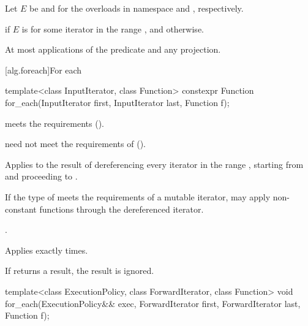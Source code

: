 \begin{itemdescr}
\pnum
Let $E$ be  and 
for the overloads in namespace  and , respectively.

\pnum
\returns
{} if $E$ is 
for some iterator  in the range , and
 otherwise.

\pnum
\complexity
At most  applications of the predicate and any projection.
\end{itemdescr}

[alg.foreach]{For each}

%
\begin{itemdecl}
template<class InputIterator, class Function>
  constexpr Function for_each(InputIterator first, InputIterator last, Function f);
\end{itemdecl}

\begin{itemdescr}
\pnum
\expects
{} meets
the  requirements ().
\begin{note}
 need not meet the requirements of
 ().
\end{note}

\pnum
\effects
Applies  to the result of dereferencing
every iterator in the range ,
starting from  and proceeding to .
\begin{note}
If the type of  meets the requirements of a mutable iterator,
 may apply non-constant functions through the dereferenced iterator.
\end{note}

\pnum
\returns
{}.

\pnum
\complexity
Applies  exactly  times.

\pnum
\remarks
If  returns a result, the result is ignored.
\end{itemdescr}

%
\begin{itemdecl}
template<class ExecutionPolicy, class ForwardIterator, class Function>
  void for_each(ExecutionPolicy&& exec,
                ForwardIterator first, ForwardIterator last,
                Function f);
\end{itemdecl}

